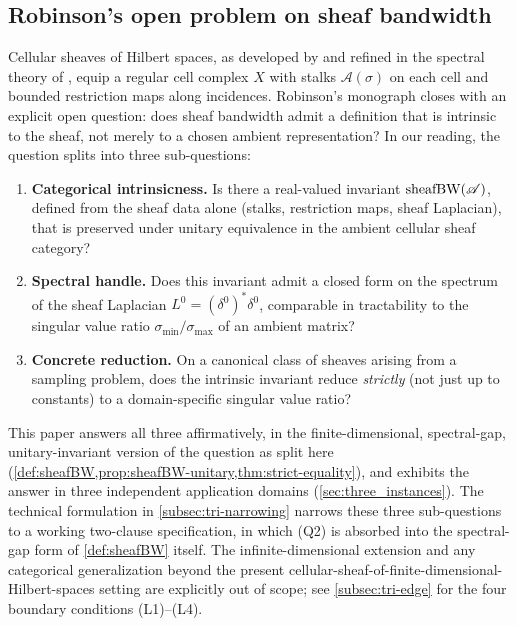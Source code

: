 
\subsection{Robinson's open problem on sheaf bandwidth}\label{subsec:intro-robinson}

Cellular sheaves of Hilbert spaces, as developed by
\cite{Robinson2014} and refined in the spectral theory of
\cite{HansenGhrist2019}, equip a regular cell complex $X$ with stalks
$\mathscr{A}(\sigma)$ on each cell and bounded restriction maps along
incidences. Robinson's monograph closes \cite[\S 6]{Robinson2014} with
an explicit open question: does sheaf bandwidth admit a definition
that is intrinsic to the sheaf, not merely to a chosen ambient
representation? In our reading, the question splits into three sub-questions:
\begin{enumerate}[leftmargin=*,label=(Q\arabic*)]
\item \textbf{Categorical intrinsicness.} Is there a real-valued
  invariant $\operatorname{sheafBW}(\mathscr{A})$, defined from the sheaf data alone
  (stalks, restriction maps, sheaf Laplacian), that is preserved under
  unitary equivalence in the ambient cellular sheaf category?
\item \textbf{Spectral handle.} Does this invariant admit a closed
  form on the spectrum of the sheaf Laplacian
  $L^0 = (\delta^0)^* \delta^0$, comparable in tractability to the
  singular value ratio $\sigma_{\min}/\sigma_{\max}$ of an ambient
  matrix?
\item \textbf{Concrete reduction.} On a canonical class of sheaves
  arising from a sampling problem, does the intrinsic invariant
  reduce \emph{strictly} (not just up to constants) to a
  domain-specific singular value ratio?
\end{enumerate}
This paper answers all three affirmatively, in the
finite-dimensional, spectral-gap, unitary-invariant version of the
question as split here
(\cref{def:sheafBW,prop:sheafBW-unitary,thm:strict-equality}), and
exhibits the answer in three independent application domains
(\cref{sec:three_instances}). The technical formulation in
\cref{subsec:tri-narrowing} narrows these three sub-questions to a
working two-clause specification, in which (\textup{Q2}) is absorbed
into the spectral-gap form of \cref{def:sheafBW} itself. The
infinite-dimensional extension and any categorical generalization
beyond the present cellular-sheaf-of-finite-dimensional-Hilbert-spaces
setting are explicitly out of scope; see \cref{subsec:tri-edge} for
the four boundary conditions (L1)--(L4).

